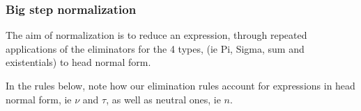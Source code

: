 \documentclass{article}
\begin{document}
\subsubsection{Big step normalization}

The aim of normalization is to reduce an
expression, through repeated applications of the eliminators for the 4 types,
(ie Pi, Sigma, sum and existentials) to head normal form.



In the rules below, note how our elimination rules account for expressions
in head normal form, ie $\nu$ and $\tau$, as well as neutral ones, ie $n$.


\end{document}
